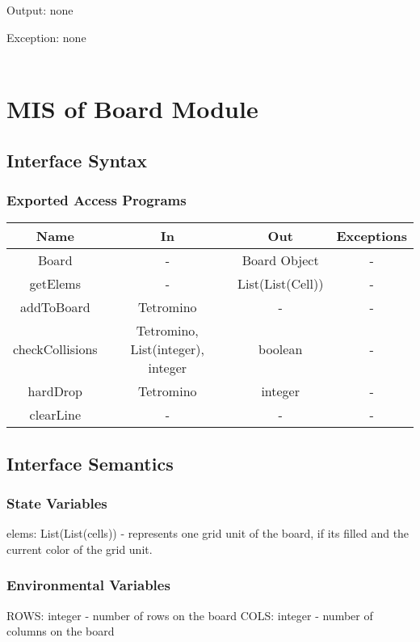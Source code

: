 \documentclass[12,english]{article}
\begin{document}
			Output: none
			
			Exception: none\\
			\\	
\section{MIS of Board Module}
		\subsection{Interface Syntax}
			\subsubsection{Exported Access Programs}
				\begin{tabular}[pos]{|c|c|c|c|}
					
					\hline
					\label{BoardEAP}
					\textbf{Name}& \textbf{In} & \textbf{Out} & \textbf{Exceptions} \\ \hline
					Board &  - & Board Object & -\\ \hline
					getElems &  - & List(List(Cell)) & -\\ \hline
					addToBoard &  Tetromino & - & -\\ \hline
                    checkCollisions &  Tetromino, List(integer), integer & boolean & -\\ \hline
                    hardDrop &  Tetromino & integer & -\\ \hline
                    clearLine &  -  & - & -\\ \hline
 				\end{tabular}
				
		\subsection{Interface Semantics}
			\subsubsection{State Variables}
			elems: List(List(cells)) - represents one grid unit of the board, if its filled and the current color of the grid unit. 
			
			
			
			\subsubsection{Environmental Variables}
			ROWS: integer - number of rows on the board
			COLS: integer - number of columns on the board
			
\end{document}
